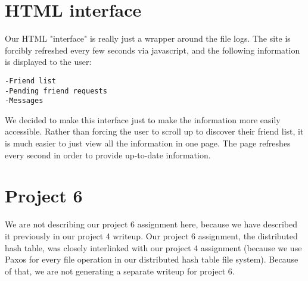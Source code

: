 \documentclass[11pt]{article}
\begin{document}
\section{HTML interface}

Our HTML "interface" is really just a wrapper around the file logs. The site is forcibly refreshed every few seconds via javascript, and the following information is displayed to the user:

\begin{verbatim}
-Friend list
-Pending friend requests
-Messages
\end{verbatim}

We decided to make this interface just to make the information more easily accessible. Rather than forcing the user to scroll up to discover their friend list, it is much easier to just view all the information in one page. The page refreshes every second in order to provide up-to-date information.

\section{Project 6}

We are not describing our project 6 assignment here, because we have described it previously in our project 4 writeup. Our project 6 assignment, the distributed hash table, was closely interlinked with our project 4 assignment (because we use Paxos for every file operation in our distributed hash table file system). Because of that, we are not generating a separate writeup for project 6.
\end{document}
